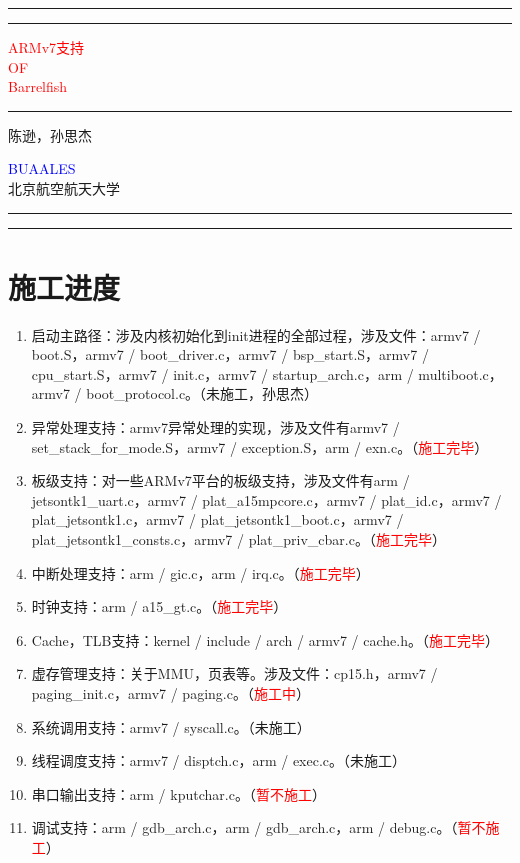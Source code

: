 \documentclass[a4paper, 12pt]{report}
\newcommand*{\titleAT}{\begingroup %
\newlength{\drop} %
\drop=0.1\textheight %

\centering %
\rule{\textwidth}{1pt}\par %
\vspace{2pt}\vspace{-\baselineskip} %
\rule{\textwidth}{0.4pt}\par %

\vspace{\drop} %
\textcolor{Red}{ %
    {\Huge ARMv7支持}\\[0.5\baselineskip] %
    {\Large OF}\\[0.75\baselineskip] %
    {\Huge Barrelfish}} %

\vspace{0.25\drop} %
\rule{0.3\textwidth}{0.4pt}\par %
\vspace{\drop} %

{\large \textsc{陈逊，孙思杰}}\par %

\vfill %
{\large \textcolor{Blue}{BUAALES}}\\[0.5\baselineskip] %
{\large \textsc{北京航空航天大学}}\par %

\vspace*{\drop} %

\rule{\textwidth}{0.4pt}\par %
\vspace{2pt}\vspace{-\baselineskip} %
\rule{\textwidth}{1pt}\par %

\endgroup}
\begin{document}
    
    \pagestyle{empty} %
    \titleAT %
    
    \tableofcontents
	
	\chapter{施工进度}
    
    \begin{enumerate}
        \item 启动主路径：涉及内核初始化到init进程的全部过程，涉及文件：armv7 / boot.S，armv7 / boot\_driver.c，armv7 / bsp\_start.S，armv7 / cpu\_start.S，armv7 / init.c，armv7 / startup\_arch.c，arm / multiboot.c， armv7 / boot\_protocol.c。（未施工，孙思杰）
        \item 异常处理支持：armv7异常处理的实现，涉及文件有armv7 / set\_stack\_for\_mode.S，armv7 / exception.S，arm / exn.c。（\textcolor{red}{施工完毕}）
        \item 板级支持：对一些ARMv7平台的板级支持，涉及文件有arm / jetsontk1\_uart.c，armv7 / plat\_a15mpcore.c，armv7 / plat\_id.c，armv7 / plat\_jetsontk1.c，armv7 / plat\_jetsontk1\_boot.c，armv7 / plat\_jetsontk1\_consts.c，armv7 / plat\_priv\_cbar.c。（\textcolor{red}{施工完毕}）
        \item 中断处理支持：arm / gic.c，arm / irq.c。（\textcolor{red}{施工完毕}）
        \item 时钟支持：arm / a15\_gt.c。（\textcolor{red}{施工完毕}）
        \item Cache，TLB支持：kernel / include / arch / armv7 / cache.h。（\textcolor{red}{施工完毕}）
        \item 虚存管理支持：关于MMU，页表等。涉及文件：cp15.h，armv7 / paging\_init.c，armv7 / paging.c。（\textcolor{red}{施工中}）
        \item 系统调用支持：armv7 / syscall.c。（未施工）
        \item 线程调度支持：armv7 / disptch.c，arm / exec.c。（未施工）
        \item 串口输出支持：arm / kputchar.c。（\textcolor{red}{暂不施工}）
        \item 调试支持：arm / gdb\_arch.c，arm / gdb\_arch.c，arm / debug.c。（\textcolor{red}{暂不施工}）
    \end{enumerate}
    
\end{document}
